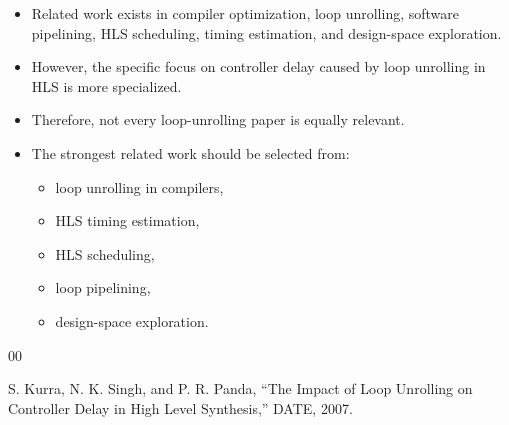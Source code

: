 \documentclass[conference]{IEEEtran}
\begin{document}
\begin{itemize}
    \item Related work exists in compiler optimization, loop unrolling, software pipelining, HLS scheduling, timing estimation, and design-space exploration.
    \item However, the specific focus on controller delay caused by loop unrolling in HLS is more specialized.
    \item Therefore, not every loop-unrolling paper is equally relevant.
    \item The strongest related work should be selected from:
    \begin{itemize}
        \item loop unrolling in compilers,
        \item HLS timing estimation,
        \item HLS scheduling,
        \item loop pipelining,
        \item design-space exploration.
    \end{itemize}
\end{itemize}

\begin{thebibliography}{00}

S. Kurra, N. K. Singh, and P. R. Panda, ``The Impact of Loop Unrolling on Controller Delay in High Level Synthesis,'' DATE, 2007.

\end{thebibliography}
\end{document}
